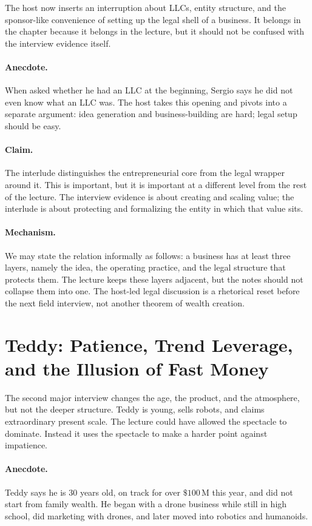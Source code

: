The host now inserts an interruption about LLCs, entity structure, and the sponsor-like convenience of setting up the legal shell of a business. It belongs in the chapter because it belongs in the lecture, but it should not be confused with the interview evidence itself.

\paragraph{Anecdote.}
When asked whether he had an LLC at the beginning, Sergio says he did not even know what an LLC was. The host takes this opening and pivots into a separate argument: idea generation and business-building are hard; legal setup should be easy.

\paragraph{Claim.}
The interlude distinguishes the entrepreneurial core from the legal wrapper around it. This is important, but it is important at a different level from the rest of the lecture. The interview evidence is about creating and scaling value; the interlude is about protecting and formalizing the entity in which that value sits.

\paragraph{Mechanism.}
We may state the relation informally as follows: a business has at least three layers, namely the idea, the operating practice, and the legal structure that protects them. The lecture keeps these layers adjacent, but the notes should not collapse them into one. The host-led legal discussion is a rhetorical reset before the next field interview, not another theorem of wealth creation.

\section{Teddy: Patience, Trend Leverage, and the Illusion of Fast Money}

The second major interview changes the age, the product, and the atmosphere, but not the deeper structure. Teddy is young, sells robots, and claims extraordinary present scale. The lecture could have allowed the spectacle to dominate. Instead it uses the spectacle to make a harder point against impatience.

\paragraph{Anecdote.}
Teddy says he is \(30\) years old, on track for over \(\$100\,\mathrm{M}\) this year, and did not start from family wealth. He began with a drone business while still in high school, did marketing with drones, and later moved into robotics and humanoids.

